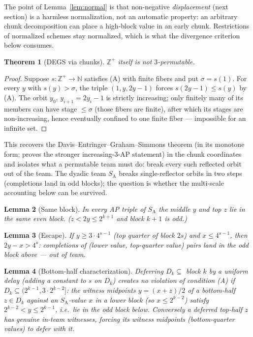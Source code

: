 \documentclass[11pt]{article}
\newtheorem{theorem}{Theorem}
\newtheorem{lemma}[theorem]{Lemma}
\theoremstyle{definition}
\newcommand{\Z}{\mathbb{Z}}
\newcommand{\N}{\mathbb{N}}
\newcommand{\SA}{S_{\mathrm{A}}}
\begin{document}
\noindent The point of Lemma~\ref{lem:normal} is that non-negative
\emph{displacement} (next section) is a harmless normalization, not an
automatic property: an arbitrary chunk decomposition can place a
high-block value in an early chunk. Restrictions of normalized schemes
stay normalized, which is what the divergence criterion below consumes.

\begin{theorem}[DEGS via chunks]\label{thm:degs}
$\Z^+$ itself is not $3$-permutable.
\end{theorem}

\begin{proof}
Suppose $s\colon \Z^+ \to \N$ satisfies
(A) with finite fibers and put $\sigma = s(1)$. For every $y$ with
$s(y) > \sigma$, the triple $(1, y, 2y-1)$ forces $s(2y-1) \le s(y)$ by (A).
The orbit $y_0,\, y_{i+1} = 2y_i - 1$ is strictly increasing; only finitely
many of its members can have stage $\le \sigma$ (those fibers are finite),
after which its stages are non-increasing, hence eventually confined to one
finite fiber --- impossible for an infinite set.
\end{proof}

\noindent This recovers the Davis--Entringer--Graham--Simmons theorem (in its
monotone form; \cite{DEGS77} proves the stronger increasing-3-AP statement)
in the chunk coordinates and isolates what a permutable team must do: break every
such reflected orbit out of the team. The dyadic team $\SA$ breaks
single-reflector orbits in two steps (completions land in odd blocks); the
question is whether the multi-scale accounting below can be survived.

\begin{lemma}[Same block]\label{lem:sameblock}
In every AP triple of $\SA$ the middle $y$ and top $z$ lie in the same even
block. ($z<2y\le 2^{k+1}$ and block $k{+}1$ is odd.)
\end{lemma}

\begin{lemma}[Escape]\label{lem:escape}
If $y \ge 3\cdot 4^{s-1}$ (top quarter of block $2s$) and $x \le 4^{s-1}$,
then $2y-x > 4^{s}$: completions of (lower value, top-quarter value) pairs
land in the odd block above --- out of team.
\end{lemma}

\begin{lemma}[Bottom-half characterization]\label{lem:bottomhalf}
Deferring $D_k \subseteq$ block $k$ by a uniform delay (adding a constant to
$s$ on $D_k$) creates no violation of condition (A) if
$D_k \subseteq (2^{k-1}, 3\cdot 2^{k-2}]$: the witness midpoints
$y=(x+z)/2$ of a bottom-half $z \in D_k$ against an $\SA$-value $x$ in a
lower block (so $x \le 2^{k-2}$) satisfy
$2^{k-2} < y \le 2^{k-1}$, i.e.\ lie in the odd block below. Conversely a
deferred top-half $z$ has genuine in-team witnesses, forcing its witness
midpoints (bottom-quarter values) to defer with it.
\end{lemma}
\end{document}
